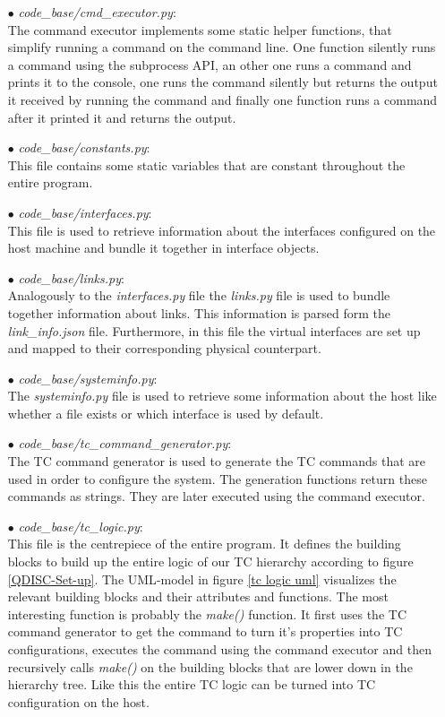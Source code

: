 \begin{enumerate}
\item[$\bullet$]\textit{code\_base/cmd\_executor.py}:
\\
The command executor implements some static helper functions, that simplify running a command on the command line. One function silently runs a command using the subprocess \acs{API}, an other one runs a command and prints it to the console, one runs the command silently but returns the output it received by running the command and finally one function runs a command after it printed it and returns the output.

\item[$\bullet$]\textit{code\_base/constants.py}:
\\
This file contains some static variables that are constant throughout the entire program. 

\item[$\bullet$]\textit{code\_base/interfaces.py}:
\\
This file is used to retrieve information about the interfaces configured on the host machine and bundle it together in interface objects.

\item[$\bullet$]\textit{code\_base/links.py}:
\\
Analogously to the \textit{interfaces.py} file the \textit{links.py} file is used to bundle together information about links. This information is parsed form the \textit{link\_info.json} file. Furthermore, in this file the virtual interfaces are set up and mapped to their corresponding physical counterpart.

\item[$\bullet$]\textit{code\_base/systeminfo.py}:
\\
The \textit{systeminfo.py} file is used to retrieve some information about the host like whether a file exists or which interface is used by default.

\item[$\bullet$]\textit{code\_base/tc\_command\_generator.py}:
\\
The \acs{TC} command generator is used to generate the \acs{TC} commands that are used in order to configure the system. The generation functions return these commands as strings. They are later executed using the command executor.

\item[$\bullet$]\textit{code\_base/tc\_logic.py}:
\\
This file is the centrepiece of the entire program. It defines the building blocks to build up the entire logic of our \acs{TC} hierarchy according to figure \ref{QDISC-Set-up}. The \ac{UML}-model in figure \ref{tc logic uml} visualizes the relevant building blocks and their attributes and functions. The most interesting function is probably the \textit{make()} function. It first uses the \acs{TC} command generator to get the command to turn it's properties into \acs{TC} configurations, executes the command using the command executor and then recursively calls \textit{make()} on the building blocks that are lower down in the hierarchy tree. Like this the entire \acs{TC} logic can be turned into \acs{TC} configuration on the host. 


\end{enumerate}
